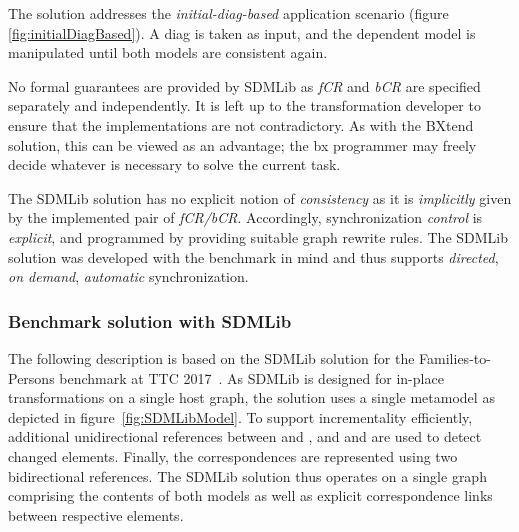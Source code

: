 The solution addresses the \emph{initial-diag-based} application scenario (figure \ref{fig:initialDiagBased}).
A diag is taken as input, and the dependent model is manipulated until both models are consistent again. 

No formal guarantees are provided by SDMLib as \emph{fCR} and \emph{bCR} are specified separately and independently.
It is left up to the transformation developer to ensure that the implementations are not contradictory.
As with the BXtend solution, this can be viewed as an advantage; the bx programmer may freely decide whatever is necessary to solve the current task.

The SDMLib solution has no explicit notion of \emph{consistency} as it is \emph{implicitly} given by the implemented pair of \emph{fCR/bCR}.
Accordingly, synchronization \emph{control} is \emph{explicit}, and programmed by providing suitable graph rewrite rules.
The SDMLib solution was developed with the benchmark in mind and thus supports \emph{directed}, \emph{on demand}, \emph{automatic} synchronization. 

\subsubsection{Benchmark solution with SDMLib}

The following description is based on the SDMLib solution for the Families-to-Persons benchmark at TTC 2017~\cite{Zundorf2017}.
As SDMLib is designed for in-place transformations on a single host graph, the solution uses a single metamodel as depicted in figure~\ref{fig:SDMLibModel}.
To support incrementality efficiently, additional unidirectional references between  and , and  and  are used to detect changed elements.
Finally, the correspondences are represented using two bidirectional references.
The SDMLib solution thus operates on a single graph comprising the contents of both models as well as explicit correspondence links between respective elements. 

